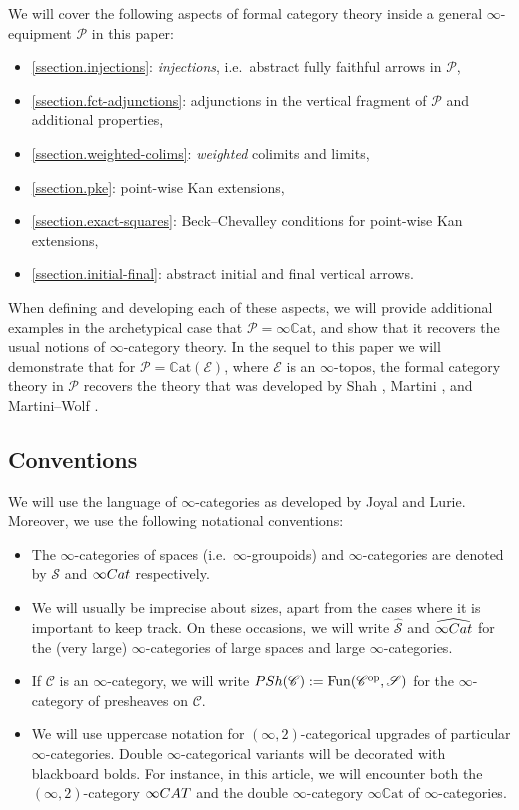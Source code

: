 \documentclass[a4paper, 11pt]{amsart}
\numberwithin{theorem}{section}
\theoremstyle{definition}
\newcommand{\cat}[1]{\textup{#1}}
\newcommand{\op}{\mathrm{op}}
\newcommand{\fun}{\mathrm{Fun}}
\newcommand{\Cat}{\cat{Cat}}
\newcommand{\CAT}{\cat{CAT}}
\renewcommand{\S}{\mathscr{S}}
\newcommand{\C}{\mathscr{C}}
\renewcommand{\P}{\mathscr{P}}
\newcommand{\E}{\mathscr{E}}
\newcommand{\PSh}{\cat{PSh}}
\newcommand{\CCAT}{\mathbb{C}\mathrm{at}}
\begin{document}
We will cover the following aspects of formal category theory inside a general $\infty$-equipment $\P$ in this paper:
\begin{itemize}
	\item \cref{ssection.injections}: \textit{injections}, i.e.\ abstract fully faithful arrows in $\P$,
	\item \cref{ssection.fct-adjunctions}: adjunctions in the vertical fragment of $\P$ and additional properties,
	\item \cref{ssection.weighted-colims}: \textit{weighted} colimits and limits,
	\item \cref{ssection.pke}: point-wise Kan extensions,
	\item \cref{ssection.exact-squares}: Beck--Chevalley conditions for point-wise Kan extensions,
	\item \cref{ssection.initial-final}: abstract initial and final vertical arrows.
\end{itemize}
When defining and developing each of these aspects, we will provide additional examples in the archetypical case that $\P = \infty\CCAT$, and show that it recovers the usual notions of $\infty$-category theory.
In the sequel to this paper \cite{EquipII} we will demonstrate that for $\P = \CCAT(\E)$, where $\E$ is an $\infty$-topos, the formal category theory in $\P$ recovers the theory 
that was developed by Shah \cite{Shah}, Martini \cite{Martini}, and Martini--Wolf \cite{MartiniWolf}.

\subsection*{Conventions} We will use the language of $\infty$-categories as developed by Joyal and Lurie. Moreover, we  use the following notational conventions:
\begin{itemize}
	\item The  $\infty$-categories of spaces (i.e.\ $\infty$-groupoids) and $\infty$-categories are denoted by $\S$ and $\infty\Cat$ respectively. 
	\item We will usually be imprecise about sizes, apart from the cases where it is important to keep track. On these occasions, we will write 
	$\widehat{\S}$ and $\widehat{\infty\Cat}$ for the (very large) $\infty$-categories of large spaces and large $\infty$-categories.
	\item If $\C$ is an $\infty$-category, we will write $\PSh(\C) := \fun(\C^\op, \S)$ for the $\infty$-cate\-go\-ry of presheaves on $\C$.
	\item We will use uppercase notation for $(\infty,2)$-categorical upgrades of particular $\infty$-categories. Double $\infty$-categorical variants will be decorated with blackboard bolds.
	For instance, in this article, we will encounter both the $(\infty,2)$-category $\infty\CAT$ and the double $\infty$-category $\infty\CCAT$ of $\infty$-categories.
\end{itemize}
\end{document}
